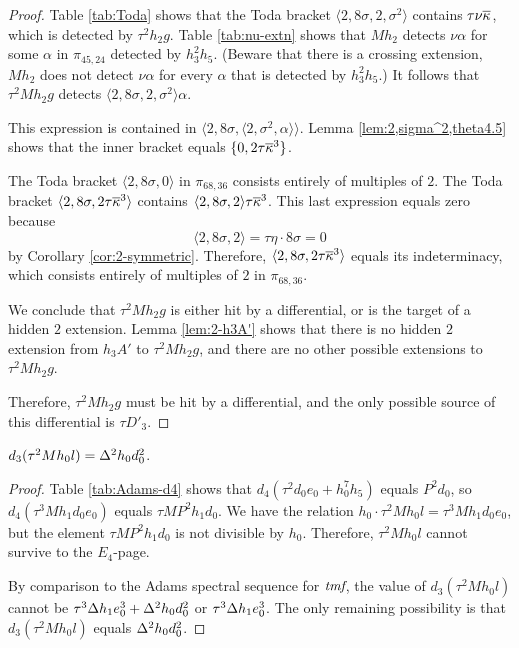 \begin{proof}
Table \ref{tab:Toda} shows that
the Toda bracket $\langle 2, 8 \sigma, 2, \sigma^2 \rangle$
contains $\tau \nu \overline{\kappa}$, which is detected by $\tau^2 h_2 g$.
Table \ref{tab:nu-extn} shows that
$M h_2$ detects $\nu \alpha$ for some
$\alpha$ in $\pi_{45,24}$ detected by $h_3^2 h_5$.
(Beware that there is a crossing extension, $M h_2$ does not
detect $\nu \alpha$ for every $\alpha$ that is detected by
$h_3^2 h_5$.)
It follows that
$\tau^2 M h_2 g$ detects
$\langle 2, 8 \sigma, 2, \sigma^2 \rangle \alpha$.

This expression is contained in
$\langle 2, 8 \sigma, \langle 2, \sigma^2, \alpha \rangle \rangle$.
Lemma \ref{lem:2,sigma^2,theta4.5} shows that
the inner bracket equals
$\{0, 2 \tau \overline{\kappa}^3 \}$.

The Toda bracket
$\langle 2, 8 \sigma, 0 \rangle$ 
in $\pi_{68,36}$
consists entirely of multiples of $2$.
The Toda bracket
$\langle 2, 8 \sigma, 2 \tau \overline{\kappa}^3 \rangle$ contains
$\langle 2, 8 \sigma, 2 \rangle \tau \overline{\kappa}^3$.
This last expression equals zero because 
\[
\langle 2, 8 \sigma, 2 \rangle = \tau \eta \cdot 8 \sigma = 0
\]
by Corollary \ref{cor:2-symmetric}.
Therefore, 
$\langle 2, 8 \sigma, 2 \tau \overline{\kappa}^3 \rangle$ equals
its indeterminacy, which
consists entirely of multiples of $2$ in $\pi_{68,36}$.

We conclude that $\tau^2 M h_2 g$ is either hit by a differential, or
is the target of a hidden $2$ extension.  
Lemma \ref{lem:2-h3A'} shows that
there is no hidden $2$ extension from $h_3 A'$ to $\tau^2 M h_2 g$,
and there are no other possible extensions to $\tau^2 M h_2 g$.

Therefore, $\tau^2 M h_2 g$ must be hit by 
a differential, and the only possible source of this differential
is $\tau D'_3$.
\end{proof}

\begin{lemma}
\label{lem:d3-t^2Mh0l}
$d_3(\tau^2 M h_0 l) = \Delta^2 h_0 d_0^2$.
\end{lemma}

\begin{proof}
Table \ref{tab:Adams-d4} shows that
$d_4(\tau^2 d_0 e_0 + h_0^7 h_5)$ equals $P^2 d_0$, so
$d_4(\tau^3 M h_1 d_0 e_0)$ equals $\tau M P^2 h_1 d_0$.
We have the relation $h_0 \cdot \tau^2 M h_0 l = \tau^3 M h_1 d_0 e_0$,
but the element $\tau M P^2 h_1 d_0$ is not divisible by $h_0$.
Therefore, $\tau^2 M h_0 l$ cannot survive to the $E_4$-page.

By comparison to the Adams spectral sequence for $\textit{tmf}$,
the value of $d_3(\tau^2 M h_0 l)$ cannot be
$\tau^3 \Delta h_1 e_0^3 + \Delta^2 h_0 d_0^2$ or
$\tau^3 \Delta h_1 e_0^3$.
The only remaining possibility is that
$d_3(\tau^2 M h_0 l)$ equals
$\Delta^2 h_0 d_0^2$.
\end{proof}

